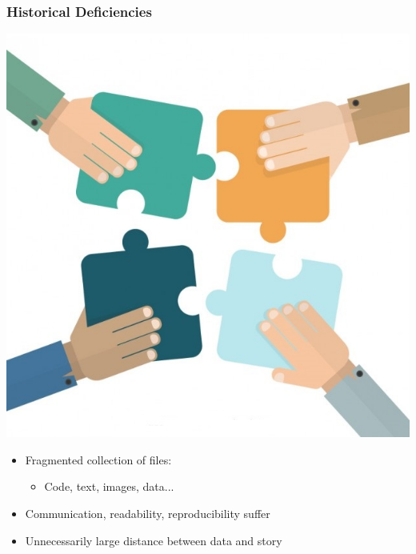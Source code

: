 \documentclass[xcolor={dvipsnames}]{beamer}
\newcommand{\ft}{\frametitle}
\newcommand{\bi}{\begin{itemize}}
\newcommand{\ei}{\end{itemize}}
\begin{document}
\begin{frame}
\ft{Historical Deficiencies}
\begin{minipage}{.45\textwidth}
\begin{center}
	\includegraphics[width = \textwidth]{hands-putting-puzzle-pieces-together_23-2147513390.jpg}
\end{center}
\end{minipage}
\begin{minipage}{.45\textwidth}
\bi
	\item Fragmented collection of files:
		\bi
			\item Code, text, images, data...
		\ei
	\item Communication, readability, reproducibility suffer
	\item Unnecessarily large distance between data and story
\ei
\end{minipage}
\end{frame}
\end{document}
